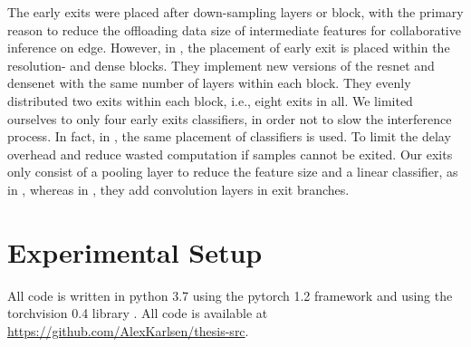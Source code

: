 The early exits were placed after down-sampling layers or block, with the primary reason to reduce the offloading data size of intermediate features for collaborative inference on edge. However, in \cite{huang_multi-scale_2017}, the placement of early exit is placed within the resolution- and dense blocks. They implement new versions of the \gls{resnet} and \gls{densenet} with the same number of layers within each block. They evenly distributed two exits within each block, i.e., eight exits in all. We limited ourselves to only four early exits classifiers, in order not to slow the interference process. In fact, in \cite{berestizshevsky_sacrificing_2019}, the same placement of classifiers is used. To limit the delay overhead and reduce wasted computation if samples cannot be exited. Our exits only consist of a pooling layer to reduce the feature size and a linear classifier, as in \cite{kaya_shallow-deep_nodate}, whereas in \cite{teerapittayanon_branchynet:_2016}, they add convolution layers in exit branches. 


\section{Experimental Setup} \label{sec:ee-exp-setup}

All code is written in \gls{python} 3.7 \cite{van_rossum_python_1995} using the \gls{pytorch} 1.2
framework \cite{paszke_automatic_2017} and using the \gls{torchvision} 0.4 library \cite{marcel_torchvision_2010}. All code is available at
{\color{sns-grey}\url{https://github.com/AlexKarlsen/thesis-src}}. 

